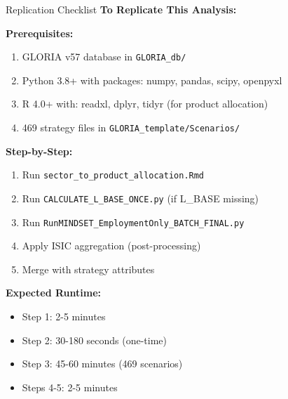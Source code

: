 \documentclass[10pt]{beamer}
\begin{document}
\begin{frame}{Replication Checklist}
\textbf{To Replicate This Analysis:}

\vspace{0.3cm}

\textbf{Prerequisites:}
\begin{enumerate}
    \item GLORIA v57 database in \texttt{GLORIA\_db/}
    \item Python 3.8+ with packages: numpy, pandas, scipy, openpyxl
    \item R 4.0+ with: readxl, dplyr, tidyr (for product allocation)
    \item 469 strategy files in \texttt{GLORIA\_template/Scenarios/}
\end{enumerate}

\vspace{0.3cm}

\textbf{Step-by-Step:}
\begin{enumerate}
    \item Run \texttt{sector\_to\_product\_allocation.Rmd}
    \item Run \texttt{CALCULATE\_L\_BASE\_ONCE.py} (if L\_BASE missing)
    \item Run \texttt{RunMINDSET\_EmploymentOnly\_BATCH\_FINAL.py}
    \item Apply ISIC aggregation (post-processing)
    \item Merge with strategy attributes
\end{enumerate}

\vspace{0.3cm}

\textbf{Expected Runtime:}
\begin{itemize}
    \item Step 1: 2-5 minutes
    \item Step 2: 30-180 seconds (one-time)
    \item Step 3: 45-60 minutes (469 scenarios)
    \item Steps 4-5: 2-5 minutes
\end{itemize}

\end{frame}

\end{document}
